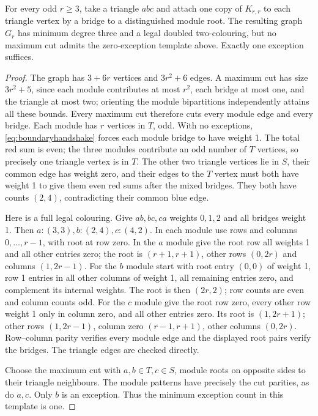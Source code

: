\begin{proposition}\label{prop:cutobstruction}
For every odd $r\ge3$, take a triangle $abc$ and attach one copy
of $K_{r,r}$ to each triangle vertex by a bridge to a distinguished
module root. The resulting graph $G_r$ has minimum degree three
and a legal doubled two-colouring, but no maximum cut admits the
zero-exception template above. Exactly one exception suffices.
\end{proposition}
\begin{proof}
The graph has $3+6r$ vertices and $3r^2+6$ edges. A maximum cut
has size $3r^2+5$, since each module contributes at most $r^2$,
each bridge at most one, and the triangle at most two; orienting
the module bipartitions independently attains all these bounds.
Every maximum cut therefore cuts every module edge and every bridge.
Each module has $r$ vertices in $T$, odd. With no exceptions,
\eqref{eq:boundaryhandshake} forces each module bridge to have
weight 1. The total red sum is even; the three modules contribute
an odd number of $T$ vertices, so precisely one triangle vertex is
in $T$. The other two triangle vertices lie in $S$, their common
edge has weight zero, and their edges to the $T$ vertex must both
have weight 1 to give them even red sums after the mixed bridges.
They both have counts $(2,4)$, contradicting their common blue edge.

Here is a full legal colouring. Give $ab,bc,ca$ weights $0,1,2$
and all bridges weight 1. Then
$a:(3,3), b:(2,4), c:(4,2)$. In each module use rows and columns
$0,\ldots,r-1$, with root at row zero. In the $a$ module give the
root row all weights 1 and all other entries zero; the root is
$(r+1,r+1)$, other rows $(0,2r)$ and columns $(1,2r-1)$.
For the $b$ module start with root entry $(0,0)$ of weight 1,
row 1 entries in all other columns of weight 1, all remaining
entries zero, and complement its internal weights. The root is
then $(2r,2)$; row counts are even and column counts odd. For the
$c$ module give the root row zero, every other row weight 1 only
in column zero, and all other entries zero. Its root is
$(1,2r+1)$; other rows $(1,2r-1)$, column zero $(r-1,r+1)$,
other columns $(0,2r)$. Row--column parity verifies every module
edge and the displayed root pairs verify the bridges. The triangle
edges are checked directly.

Choose the maximum cut with $a,b\in T,c\in S$, module roots on
opposite sides to their triangle neighbours. The module patterns
have precisely the cut parities, as do $a,c$. Only $b$ is an
exception. Thus the minimum exception count in this template is one.
\end{proof}

